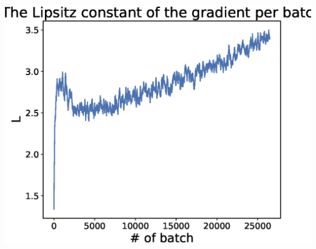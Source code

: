 \documentclass[a0]{a0poster}
\begin{document}
\begin{textblock}{7.0}
\begin{minipage}{0.35\textwidth}
\begin{center}
	\end{center}
\end{minipage}
\begin{minipage}{0.35\textwidth}	
\begin{center}
	\includegraphics[width=1\textwidth]{figures/cifar_cnn_L.eps}
\end{center}
\end{minipage}

\end{textblock}
\end{document}

